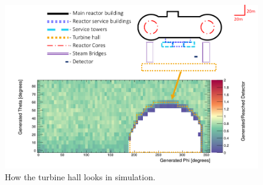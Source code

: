 \newpage
\begin{figure}[htbp]
  \centering
  \begin{turn}{-90}
  \begin{minipage}{9in}
  \centering
    \includegraphics[scale = 0.8]{Chapter5/Figs/wylfaRasterNew/TurbineHallGen_Reached.png}
  \caption{How the turbine hall looks in simulation.}
  \label{fig:TurbineHallGen_Reached}
  \end{minipage}
  \end{turn}
\end{figure}





